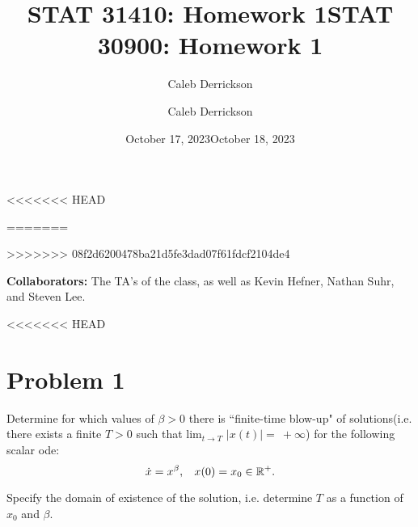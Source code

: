 

<<<<<<< HEAD
\title{STAT 31410: Homework 1}
\author{Caleb Derrickson}
\date{October 17, 2023}
=======
\title{STAT 30900: Homework 1}
\author{Caleb Derrickson}
\date{October 18, 2023}
>>>>>>> 08f2d6200478ba21d5fe3dad07f61fdcf2104de4


\onehalfspacing
\maketitle

{\color{cit}\vspace{2mm}\noindent\textbf{Collaborators:}} The TA's of the class, as well as Kevin Hefner, Nathan Suhr, and Steven Lee.

\tableofcontents

\newpage

<<<<<<< HEAD
\section{Problem 1}
Determine for which values of $\beta > 0$ there is ``finite-time blow-up" of solutions(i.e. there exists a finite $T > 0$ such that lim$_{t \rightarrow T}$ $\lvert x(t) \rvert = \ + \infty$) for the following scalar ode:
\[
\dot{x} = x^\beta, \hspace{3mm} x(0) = x_0 \in \mathbb{R}^+.
\]

Specify the domain of existence of the solution, i.e. determine $T$ as a function of $x_0$ and $\beta$.

